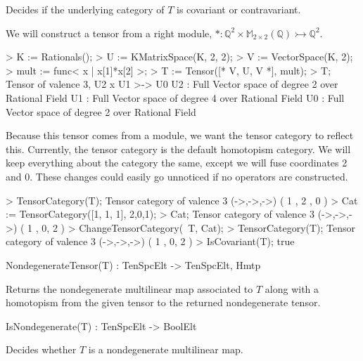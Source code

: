 Decides if the underlying category of $T$ is covariant or contravariant.

\begin{example}[TensorCatProps]

We will construct a tensor from a right module, $*:\mathbb{Q}^2 \times \mathbb{M}_{2\times 2}(\mathbb{Q})\rightarrowtail \mathbb{Q}^2$.
\begin{code}
> K := Rationals();
> U := KMatrixSpace(K, 2, 2);
> V := VectorSpace(K, 2);
> mult := func< x | x[1]*x[2] >;
> T := Tensor([* V, U, V *], mult);
> T;
Tensor of valence 3, U2 x U1 >-> U0
U2 : Full Vector space of degree 2 over Rational Field
U1 : Full Vector space of degree 4 over Rational Field
U0 : Full Vector space of degree 2 over Rational Field
\end{code}

Because this tensor comes from a module, we want the tensor category to reflect this.
Currently, the tensor category is the default homotopism category.
We will keep everything about the category the same, except we will fuse coordinates 2 and 0.
These changes could easily go unnoticed if no operators are constructed.
\begin{code}
> TensorCategory(T);
Tensor category of valence 3 (->,->,->) ({ 1 },{ 2 },{ 0 })
> Cat := TensorCategory([1, 1, 1], {{2,0},{1}});
> Cat;
Tensor category of valence 3 (->,->,->) ({ 1 },{ 0, 2 })
> ChangeTensorCategory(~T, Cat);
> TensorCategory(T);
Tensor category of valence 3 (->,->,->) ({ 1 },{ 0, 2 })
> IsCovariant(T);
true
\end{code}
\end{example}

\begin{intrinsics}
NondegenerateTensor(T) : TenSpcElt -> TenSpcElt, Hmtp
\end{intrinsics}

Returns the nondegenerate multilinear map associated to $T$ along with a homotopism 
from the given tensor to the returned nondegenerate tensor.

\begin{intrinsics}
IsNondegenerate(T) : TenSpcElt -> BoolElt
\end{intrinsics}

Decides whether $T$ is a nondegenerate multilinear map.


